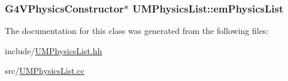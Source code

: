 \subsubsection[{em\+Physics\+List}]{\setlength{\rightskip}{0pt plus 5cm}G4\+V\+Physics\+Constructor$\ast$ U\+M\+Physics\+List\+::em\+Physics\+List\hspace{0.3cm}{\ttfamily [private]}}\label{classUMPhysicsList_ac94accb41c3f5cd8eb34019dfdabfbed}


The documentation for this class was generated from the following files\+:\begin{DoxyCompactItemize}
\item 
include/\hyperlink{UMPhysicsList_8hh}{U\+M\+Physics\+List.\+hh}\item 
src/\hyperlink{UMPhysicsList_8cc}{U\+M\+Physics\+List.\+cc}\end{DoxyCompactItemize}
